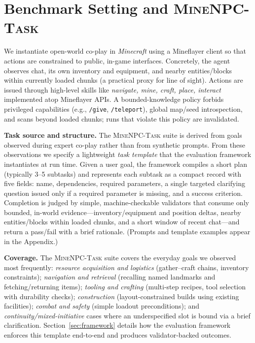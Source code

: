 \section[Benchmark Setting and \textsc{MineNPC-Task}]{Benchmark Setting and \textsc{MineNPC-Task}}
\label{sec:setting}

We instantiate open-world co-play in \emph{Minecraft} using a Mineflayer client so that actions are constrained to public, in-game interfaces. Concretely, the agent observes chat, its own inventory and equipment, and nearby entities/blocks within currently loaded chunks (a practical proxy for line of sight). Actions are issued through high-level skills like \emph{navigate, mine, craft, place, interact} implemented atop Mineflayer APIs. A bounded-knowledge policy forbids privileged capabilities (e.g., \texttt{/give}, \texttt{/teleport}), global map/seed introspection, and scans beyond loaded chunks; runs that violate this policy are invalidated.

\textbf{Task source and structure.} The \textsc{MineNPC-Task} suite is derived from goals observed during expert co-play rather than from synthetic prompts. From these observations we specify a lightweight \emph{task template} that the evaluation framework instantiates at run time. Given a user goal, the framework compiles a short plan (typically 3–5 subtasks) and represents each subtask as a compact record with five fields: name, dependencies, required parameters, a single targeted clarifying question issued only if a required parameter is missing, and a success criterion. Completion is judged by simple, machine-checkable validators that consume only bounded, in-world evidence—inventory/equipment and position deltas, nearby entities/blocks within loaded chunks, and a short window of recent chat—and return a pass/fail with a brief rationale. (Prompts and template examples appear in the Appendix.)

\textbf{Coverage.} The \textsc{MineNPC-Task} suite covers the everyday goals we observed most frequently: \emph{resource acquisition and logistics} (gather–craft chains, inventory constraints); \emph{navigation and retrieval} (recalling named landmarks and fetching/returning items); \emph{tooling and crafting} (multi-step recipes, tool selection with durability checks); \emph{construction} (layout-constrained builds using existing facilities); \emph{combat and safety} (simple loadout preconditions); and \emph{continuity/mixed-initiative} cases where an underspecified slot is bound via a brief clarification. Section~\ref{sec:framework} details how the evaluation framework enforces this template end-to-end and produces validator-backed outcomes.